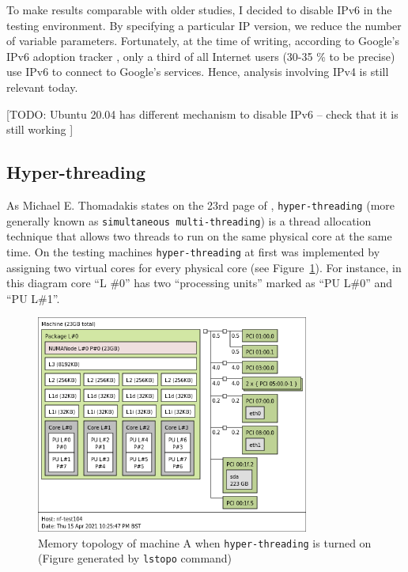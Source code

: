 \documentclass[12pt,a4paper,twoside,openright]{report}
\begin{document}
To make results comparable with older studies, I decided to disable IPv6 in the testing environment.
By specifying a particular IP version, we reduce the number of variable parameters.
Fortunately, at the time of writing, according to Google's IPv6 adoption tracker \cite{IPv6_Adoption_Statistics}, only a third of all Internet users (30-35 \% to be precise) use IPv6 to connect to Google's services.
Hence, analysis involving IPv4 is still relevant today.

[TODO: Ubuntu 20.04 has different mechanism  to disable IPv6 -- check that it is still working ]

\subsection{Hyper-threading}\label{Hyperthreading_Subsection_Tag}

As Michael E. Thomadakis states on the 23rd page of \cite{hyperthreading_book}, \texttt{hyper-threading} (more generally known as \texttt{simultaneous multi-threading}) is a thread allocation technique that allows two threads to run on the same physical core at the same time.
On the testing machines \texttt{hyper-threading} at first was implemented by assigning two virtual cores for every physical core (see Figure~\ref{fig:topology_with_hyperthreading}).
For instance, in this diagram core \enquote{L \#0} has two \enquote{processing units} marked as \enquote{PU L\#0} and \enquote{PU L\#1}.

    \begin{figure}[H]
    \centering
    \includegraphics[width=0.8\textwidth]{figs/topology_with_hyperthreading.png}
    \caption{Memory topology of machine A when \texttt{hyper-threading} is turned on (Figure generated by \texttt{lstopo} command)}
    \label{fig:topology_with_hyperthreading}
    \end{figure}
\end{document}
